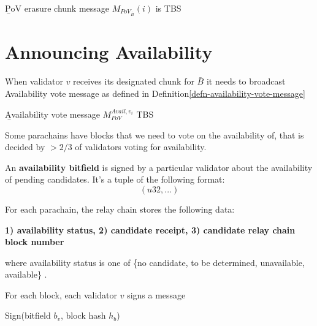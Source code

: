 \begin{definition}
  \label{defn-pov-erasure-chunk-message}
        {\b PoV erasure chunk message} $M_{PoV_{\bar{B}}}(i)$ is TBS
\end{definition}

\section{Announcing Availability}\label{sect-voting-on-availability}

When validator $v$ receives its designated chunk for $\bar{B}$ it needs to
broadcast Availability vote message as defined in
Definition\ref{defn-availability-vote-message}
\begin{definition}
  \label{defn-availability-vote-message}
        {\b Availability vote message} $M_{PoV}^{Avail,v_i}$ TBS
\end{definition}

Some parachains have blocks that we need to vote on the availability of, that is
decided by $> 2/3$ of validators voting for availability. 
\newline

\begin{definition}
  \label{defn-availability-bitfield}
  An \textbf{availability bitfield} is signed by a particular validator about the availability
  of pending candidates. It's a tuple of the following format:
  \[
    (u32, ...)
  \]
\end{definition}

For each parachain, the relay chain stores the following data:

\textbf{1) availability status, 2) candidate receipt, 3) candidate relay chain block number}

where availability status is one of \{no candidate, to be determined,
unavailable, available\} .

For each block, each validator $v$ signs a message

Sign(bitfield $b_v$, block hash $h_b$)

